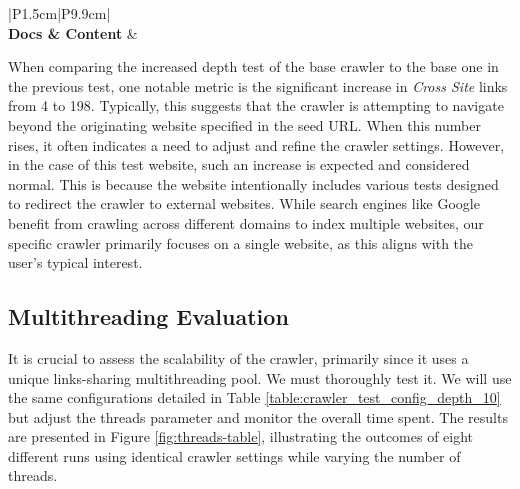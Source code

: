 {\begin{table}[ht]
{\begin{tabular}{|P{1.5cm}|P{9.9cm}|}
\\ 
\hline
\textbf{Docs \& Content} & 
\\ 
\hline
    \end{tabular}
}
  \captionsetup{justification=centering,margin=2cm}
  \caption{Completed crawler result of the crawler-test.com
web site when the depth is 10.}
      \label{table:crawler_test_result_depth_10}
\end{table}

When comparing the increased depth test of the base crawler to the base one in the previous test, one notable metric is the significant increase in \textit{Cross Site} links from 4 to 198. Typically, this suggests that the crawler is attempting to navigate beyond the originating website specified in the seed URL. When this number rises, it often indicates a need to adjust and refine the crawler settings. However, in the case of this test website, such an increase is expected and considered normal. This is because the website intentionally includes various tests designed to redirect the crawler to external websites. While search engines like Google benefit from crawling across different domains to index multiple websites, our specific crawler primarily focuses on a single website, as this aligns with the user's typical interest.

\subsection*{Multithreading Evaluation}

It is crucial to assess the scalability of the crawler, primarily since it uses a unique links-sharing multithreading pool. We must thoroughly test it. We will use the same configurations detailed in Table \ref{table:crawler_test_config_depth_10} but adjust the threads parameter and monitor the overall time spent. The results are presented in Figure \ref{fig:threads-table}, illustrating the outcomes of eight different runs using identical crawler settings while varying the number of threads.

}
